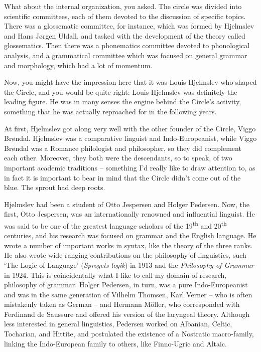 What about the internal organization, you asked. The circle was divided into scientific committees, each of them devoted to the discussion of specific topics. There was a glossematic committee, for instance, which was formed by Hjelmslev and Hans Jørgen Uldall, and tasked with the development of the theory called glossematics. Then there was a phonematics committee devoted to phonological analysis, and a grammatical committee which was focused on general grammar and morphology, which had a lot of momentum. 

Now, you might have the impression here that it was Louis Hjelmslev who shaped the Circle, and you would be quite right: Louis Hjelmslev was definitely the leading figure. He was in many senses the engine behind the Circle’s activity, something that he was actually reproached for in the following years. 

At first, Hjelmslev got along very well with the other founder of the Circle, Viggo Brøndal. Hjelmslev was a comparative linguist and Indo-Europeanist, while Viggo Brøndal was a Romance philologist and philosopher, so they did complement each other. Moreover, they both were the descendants, so to speak, of two important academic traditions – something I’d really like to draw attention to, as in fact it is important to bear in mind that the Circle didn’t come out of the blue. The sprout had deep roots. 

Hjelmslev had been a student of Otto Jespersen and Holger Pedersen. Now, the first, Otto Jespersen, was an internationally renowned and influential linguist. He was said to be one of the greatest language scholars of the 19\textsuperscript{th} and 20\textsuperscript{th} centuries, and his research was focused on grammar and the English language. He wrote a number of important works in syntax, like the theory of the three ranks. He also wrote wide-ranging contributions on the philosophy of linguistics, such ‘The Logic of Language’ (\textit{Sprogets logik}) in 1913 and the \textit{Philosophy of Grammar} in 1924. This is coincidentally what I like to call my domain of research, philosophy of grammar. Holger Pedersen, in turn, was a pure Indo-Europeanist and was in the same generation of Vilhelm Thomsen, Karl Verner – who is often mistakenly taken as German – and Hermann Möller, who corresponded with Ferdinand de Saussure and offered his version of the laryngeal theory. Although less interested in general linguistics, Pedersen worked on Albanian, Celtic, Tocharian, and Hittite, and postulated the existence of a Nostratic macro-family, linking the Indo-European family to others, like Finno-Ugric and Altaic. 

